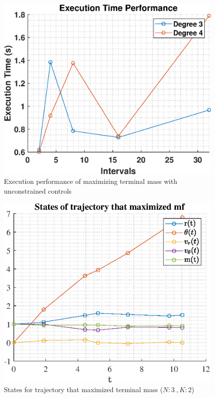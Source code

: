 \documentclass[]{article}
\begin{document}
	\begin{figure}
		\centering
		\includegraphics[scale=0.75]{runtime_c2_mf.eps}
		\caption{Execution performance of maximizing terminal mass with unconstrained controls}
		\label{fig:runtime_c2_mf}
	\end{figure}
	\begin{figure}
		\centering
		\includegraphics[scale=0.75]{states_N3_K2_C2_mf.eps}
		\caption{States for trajectory that maximized terminal mass (\(N:3\ , K:2\))}
		\label{fig:states_N3_K2_C2_mf}
	\end{figure}
\end{document}
